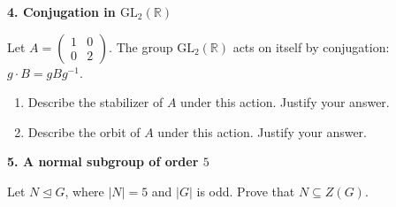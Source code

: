 \documentclass[11pt,letterpaper]{article}
\newcommand{\question}[1]{\par\medskip\noindent\textbf{#1}\par}
\begin{document}
\question{4. Conjugation in $\mathrm{GL}_2(\mathbb R)$}
Let $A=\begin{pmatrix}1&0\\0&2\end{pmatrix}$. The group $\mathrm{GL}_2(\mathbb R)$ acts on itself by conjugation: $g\cdot B=gBg^{-1}$.
\begin{enumerate}[label=(\alph*)]
\item Describe the stabilizer of $A$ under this action. Justify your answer.
\item Describe the orbit of $A$ under this action. Justify your answer.
\end{enumerate}

\question{5. A normal subgroup of order $5$}
Let $N\trianglelefteq G$, where $|N|=5$ and $|G|$ is odd. Prove that $N\subseteq Z(G)$.
\end{document}
